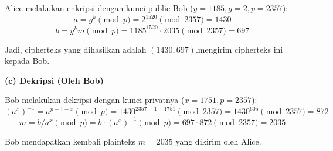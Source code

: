 \documentclass{article}
\begin{document}

Alice melakukan enkripsi dengan kunci public Bob ($y = 1185, g = 2, p = 2357$):
\[ a = g^k \pmod p = 2^{1520} \pmod{2357} = 1430 \]
\[ b = y^k m \pmod p = 1185^{1520} \cdot 2035 \pmod{2357} = 697 \]

Jadi, cipherteks yang dihasilkan adalah $(1430, 697)$.\nAlice mengirim cipherteks ini kepada Bob.

\textbf{(c) Dekripsi (Oleh Bob)}

Bob melakukan dekripsi dengan kunci privatnya ($x = 1751, p = 2357$):
\[ (a^x)^{-1} = a^{p-1-x} \pmod p = 1430^{2357-1-1751} \pmod{2357} = 1430^{605} \pmod{2357} = 872 \]
\[ m = b/a^x \pmod p = b \cdot (a^x)^{-1} \pmod p = 697 \cdot 872 \pmod{2357} = 2035 \]

Bob mendapatkan kembali plainteks $m = 2035$ yang dikirim oleh Alice.
\end{document}
